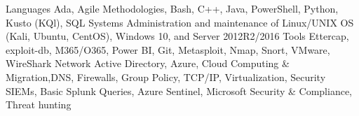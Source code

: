 \begin{cvskills}
  \cvskill
    {Languages} %
     {Ada, Agile Methodologies, Bash, C++, Java, PowerShell, Python, Kusto (KQl), SQL} %
  \cvskill
    {Systems} %
    {Administration and maintenance of Linux/UNIX OS (Kali, Ubuntu, CentOS), Windows 10, and Server 2012R2/2016}  
  \cvskill
     {Tools}
     {Ettercap, exploit-db, M365/O365, Power BI, Git, Metasploit, Nmap, Snort, VMware, WireShark}
  \cvskill
     {Network}
     {Active Directory, Azure, Cloud Computing \& Migration,DNS, Firewalls, Group Policy, TCP/IP, Virtualization,}
  \cvskill
     {Security}
     {SIEMs, Basic Splunk Queries, Azure Sentinel, Microsoft Security \& Compliance, Threat hunting}
\end{cvskills}
